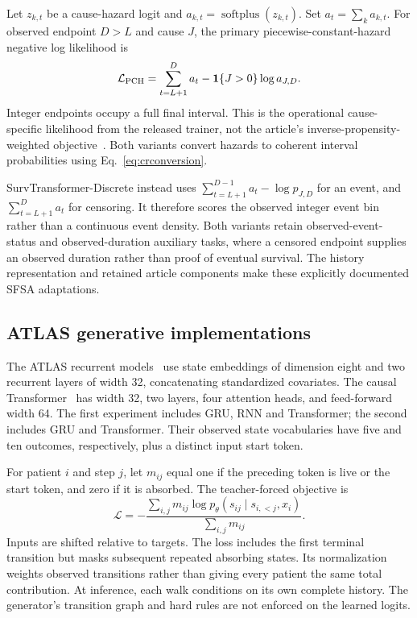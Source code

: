 Let $z_{k,t}$ be a cause-hazard logit and $a_{k,t}=\operatorname{softplus}(z_{k,t})$. Set $a_t=\sum_k a_{k,t}$. For observed endpoint $D>L$ and cause $J$, the primary piecewise-constant-hazard negative log likelihood is
\[
\mathcal L_{\rm PCH}=\sum_{t=L+1}^{D}a_t-\mathbf 1\{J>0\}\log a_{J,D}.
\]
Integer endpoints occupy a full final interval. This is the operational cause-specific likelihood from the released trainer, not the article's inverse-propensity-weighted objective~\citep{survtracecode}. Both variants convert hazards to coherent interval probabilities using Eq.~\eqref{eq:crconversion}.

SurvTransformer-Discrete instead uses $\sum_{t=L+1}^{D-1}a_t-\log p_{J,D}$ for an event, and $\sum_{t=L+1}^{D}a_t$ for censoring. It therefore scores the observed integer event bin rather than a continuous event density. Both variants retain observed-event-status and observed-duration auxiliary tasks, where a censored endpoint supplies an observed duration rather than proof of eventual survival. The history representation and retained article components make these explicitly documented SFSA adaptations.

\subsection{ATLAS generative implementations}
The ATLAS recurrent models~\citep{cho2014,hochreiter1997} use state embeddings of dimension eight and two recurrent layers of width 32, concatenating standardized covariates. The causal Transformer~\citep{vaswani2017} has width 32, two layers, four attention heads, and feed-forward width 64. The first experiment includes GRU, RNN and Transformer; the second includes GRU and Transformer. Their observed state vocabularies have five and ten outcomes, respectively, plus a distinct input start token.

For patient $i$ and step $j$, let $m_{ij}$ equal one if the preceding token is live or the start token, and zero if it is absorbed. The teacher-forced objective is
\begin{equation}\label{eq:atlasloss}
\mathcal L=-\frac{\sum_{i,j}m_{ij}\log p_\theta(s_{ij}\mid s_{i,<j},x_i)}{\sum_{i,j}m_{ij}}.
\end{equation}
Inputs are shifted relative to targets. The loss includes the first terminal transition but masks subsequent repeated absorbing states. Its normalization weights observed transitions rather than giving every patient the same total contribution. At inference, each walk conditions on its own complete history. The generator's transition graph and hard rules are not enforced on the learned logits.

